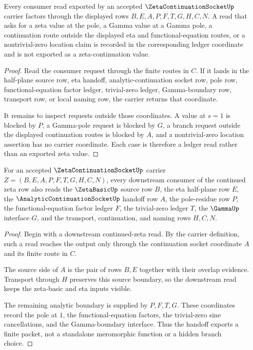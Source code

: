 \begin{theorem}
\label{thm:zeta-continuation-socket-ledger-nonescape}
Every consumer read exported by an accepted $\ZetaContinuationSocketUp$ carrier factors through the displayed rows $B,E,A,P,F,T,G,H,C,N$. A read that asks for a zeta value at the pole, a Gamma value at a Gamma pole, a continuation route outside the displayed eta and functional-equation routes, or a nontrivial-zero location claim is recorded in the corresponding ledger coordinate and is not exported as a zeta-continuation value.
\end{theorem}
\begin{proof}
Read the consumer request through the finite routes in $C$. If it lands in the half-plane source row, eta handoff, analytic-continuation socket row, pole row, functional-equation factor ledger, trivial-zero ledger, Gamma-boundary row, transport row, or local naming row, the carrier returns that coordinate.

It remains to inspect requests outside those coordinates. A value at $s=1$ is blocked by $P$, a Gamma-pole request is blocked by $G$, a branch request outside the displayed continuation routes is blocked by $A$, and a nontrivial-zero location assertion has no carrier coordinate. Each case is therefore a ledger read rather than an exported zeta value.
\end{proof}

\begin{theorem}
\label{thm:zeta-continuation-socket-analytic-handoff}
For an accepted $\ZetaContinuationSocketUp$ carrier $Z=(B,E,A,P,F,T,G,H,C,N)$, every downstream consumer of the continued zeta row also reads the $\ZetaBasicUp$ source row $B$, the eta half-plane row $E$, the $\AnalyticContinuationSocketUp$ handoff row $A$, the pole-residue row $P$, the functional-equation factor ledger $F$, the trivial-zero ledger $T$, the $\GammaUp$ interface $G$, and the transport, continuation, and naming rows $H,C,N$.
\end{theorem}
\begin{proof}
Begin with a downstream continued-zeta read. By the carrier definition, such a read reaches the output only through the continuation socket coordinate $A$ and its finite route in $C$.

The source side of $A$ is the pair of rows $B,E$ together with their overlap evidence. Transport through $H$ preserves this source boundary, so the downstream read keeps the zeta-basic and eta inputs visible.

The remaining analytic boundary is supplied by $P,F,T,G$. These coordinates record the pole at $1$, the functional-equation factors, the trivial-zero sine cancellations, and the Gamma-boundary interface. Thus the handoff exports a finite packet, not a standalone meromorphic function or a hidden branch choice.
\end{proof}

